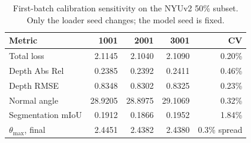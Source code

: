 \begin{table}[t]
\centering
\caption{First-batch calibration sensitivity on the NYUv2 50\% subset. Only the loader seed changes; the model seed is fixed.}
\label{tab:first_batch}
\small
\begin{tabular}{lrrrr}
\toprule
Metric & 1001 & 2001 & 3001 & CV \\
\midrule
Total loss & 2.1145 & 2.1040 & 2.1090 & 0.20\% \\
Depth Abs Rel & 0.2385 & 0.2392 & 0.2411 & 0.46\% \\
Depth RMSE & 0.8348 & 0.8302 & 0.8325 & 0.23\% \\
Normal angle & 28.9205 & 28.8975 & 29.1069 & 0.32\% \\
Segmentation mIoU & 0.1912 & 0.1866 & 0.1952 & 1.84\% \\
$\theta_{\max}$, final & 2.4451 & 2.4382 & 2.4380 & 0.3\% spread \\
\bottomrule
\end{tabular}
\end{table}
